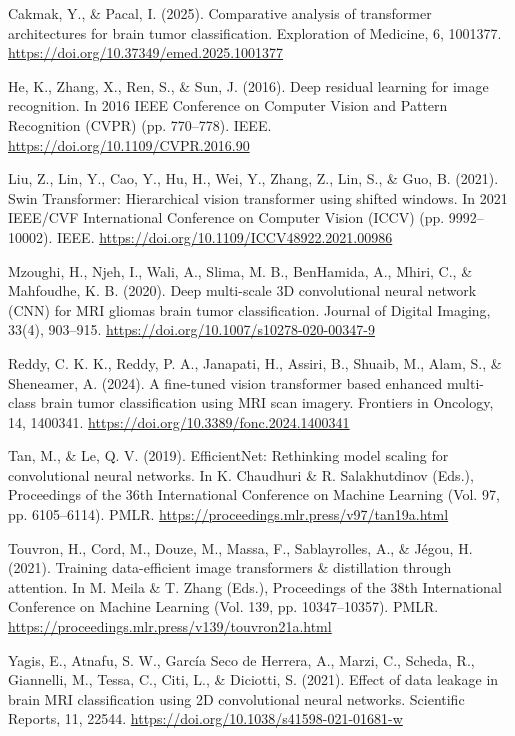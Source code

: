 \documentclass{article}
\begin{document}
\clearpage
\begingroup
\renewcommand{\bibsection}{\section*{References}}
\begin{thebibliography}{}

Cakmak, Y., \& Pacal, I. (2025). Comparative analysis of transformer architectures for brain tumor classification.
Exploration of Medicine, 6, 1001377. \url{https://doi.org/10.37349/emed.2025.1001377}

He, K., Zhang, X., Ren, S., \& Sun, J. (2016). Deep residual learning for image recognition.
In 2016 IEEE Conference on Computer Vision and Pattern Recognition (CVPR) (pp. 770--778).
IEEE. \url{https://doi.org/10.1109/CVPR.2016.90}

Liu, Z., Lin, Y., Cao, Y., Hu, H., Wei, Y., Zhang, Z., Lin, S., \& Guo, B. (2021).
Swin Transformer: Hierarchical vision transformer using shifted windows.
In 2021 IEEE/CVF International Conference on Computer Vision (ICCV) (pp. 9992--10002).
IEEE. \url{https://doi.org/10.1109/ICCV48922.2021.00986}

Mzoughi, H., Njeh, I., Wali, A., Slima, M. B., BenHamida, A., Mhiri, C., \& Mahfoudhe, K. B. (2020).
Deep multi-scale 3D convolutional neural network (CNN) for MRI gliomas brain tumor classification.
Journal of Digital Imaging, 33(4), 903--915.
\url{https://doi.org/10.1007/s10278-020-00347-9}

Reddy, C. K. K., Reddy, P. A., Janapati, H., Assiri, B., Shuaib, M., Alam, S., \& Sheneamer, A. (2024).
A fine-tuned vision transformer based enhanced multi-class brain tumor classification using MRI scan imagery.
Frontiers in Oncology, 14, 1400341. \url{https://doi.org/10.3389/fonc.2024.1400341}

Tan, M., \& Le, Q. V. (2019). EfficientNet: Rethinking model scaling for convolutional neural networks.
In K. Chaudhuri \& R. Salakhutdinov (Eds.), Proceedings of the 36th International Conference on Machine Learning
(Vol. 97, pp. 6105--6114). PMLR. \url{https://proceedings.mlr.press/v97/tan19a.html}

Touvron, H., Cord, M., Douze, M., Massa, F., Sablayrolles, A., \& J\'egou, H. (2021).
Training data-efficient image transformers \& distillation through attention.
In M. Meila \& T. Zhang (Eds.), Proceedings of the 38th International Conference on Machine Learning
(Vol. 139, pp. 10347--10357). PMLR. \url{https://proceedings.mlr.press/v139/touvron21a.html}

Yagis, E., Atnafu, S. W., Garc{\'i}a Seco de Herrera, A., Marzi, C., Scheda, R., Giannelli, M., Tessa, C., Citi, L.,
\& Diciotti, S. (2021). Effect of data leakage in brain MRI classification using 2D convolutional neural networks.
Scientific Reports, 11, 22544. \url{https://doi.org/10.1038/s41598-021-01681-w}

\end{thebibliography}
\endgroup
\end{document}
